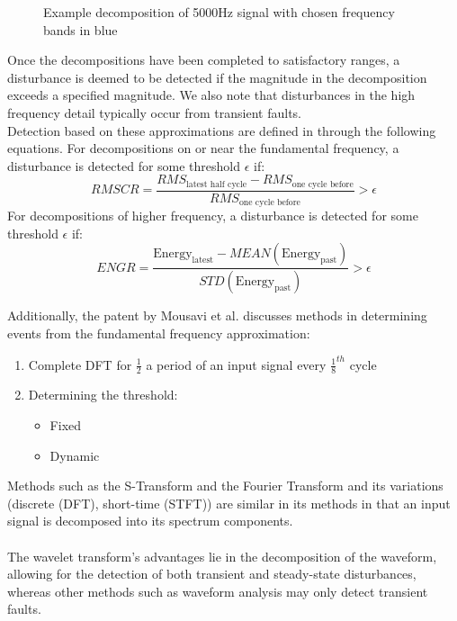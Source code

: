 \documentclass[12pt]{article}
\begin{document}
{\begin{figure}[H]
\caption{Example decomposition of 5000Hz signal with chosen frequency bands in blue}
\end{figure}

Once the decompositions have been completed to satisfactory ranges, a disturbance is deemed to be detected if the magnitude in the decomposition exceeds a specified magnitude. We also note that disturbances in the high frequency detail typically occur from transient faults. \newline
\\
Detection based on these approximations are defined in \cite{PES} through the following equations. 
For decompositions on or near the fundamental frequency, a disturbance is detected for some threshold $\epsilon$ if:
$$RMSCR = \frac{RMS_{\text{latest half cycle}} - RMS_{\text{one cycle before}}}{RMS_{\text{one cycle before}}} > \epsilon$$
For decompositions of higher frequency, a disturbance is detected for some threshold $\epsilon$ if:
$$ENGR = \frac{\text{Energy}_{\text{latest}} - MEAN(\text{Energy}_{\text{past}})}{STD(\text{Energy}_\text{past})} > \epsilon$$

Additionally, the patent by Mousavi et al. \cite{FFC} discusses methods in determining events from the fundamental frequency approximation:
\begin{enumerate}
\item Complete DFT for $\frac{1}{2}$ a period of an input signal every $\frac{1}{8}^{th}$ cycle
\item Determining the threshold:
\begin{itemize}
\item Fixed
\item Dynamic
\end{itemize}
\end{enumerate}

Methods such as the S-Transform and the Fourier Transform and its variations (discrete (DFT), short-time (STFT)) are similar in its methods in that an input signal is decomposed into its spectrum components.\\
\\
The wavelet transform's advantages lie in the decomposition of the waveform, allowing for the detection of both transient and steady-state disturbances, whereas other methods such as waveform analysis may only detect transient faults. 

}
\end{document}
